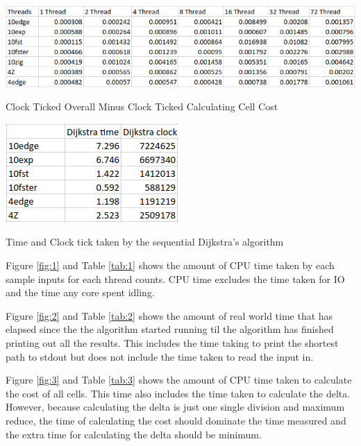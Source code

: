 \documentclass{article}
\begin{document}
\begin{table}[!htb]
\includegraphics[width=\textwidth]{path-finding-time-table.png}
\caption{Clock Ticked Overall Minus Clock Ticked Calculating Cell Cost}
\label{tab:6}
\end{table}

\begin{table}[!htb]
\includegraphics[width=\textwidth]{dijkstra-table.png}
\caption{Time and Clock tick taken by the sequential Dijkstra's algorithm}
\label{tab:7}
\end{table}

Figure \ref{fig:1} and Table \ref{tab:1} shows the amount of CPU time taken by each sample inputs
for each thread counts. CPU time excludes the time taken for IO and the time any core spent idling.

Figure \ref{fig:2} and Table \ref{tab:2} shows the amount of real world time that has elapsed since
the the algorithm started running til the algorithm has finished printing out all the results. This
includes the time taking to print the shortest path to stdout but does not include the time taken to
read the input in.

Figure \ref{fig:3} and Table \ref{tab:3} shows the amount of CPU time taken to calculate the cost of
all cells. This time also includes the time taken to calculate the delta. However, because
calculating the delta is just one single division and maximum reduce, the time of calculating the
cost should dominate the time measured and the extra time for calculating the delta should be
minimum.
\end{document}
